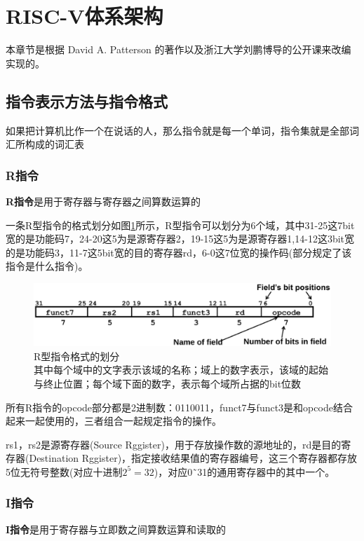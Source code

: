 \section{RISC-V体系架构}
本章节是根据 David A. Patterson 的著作\cite{Computer_Organization_and_Design_riscv}以及浙江大学刘鹏博导的公开课\cite{Computer_Organization_and_Design_ZJU}来改编实现的。

\subsection{指令表示方法与指令格式}
如果把计算机比作一个在说话的人，那么指令就是每一个单词，指令集就是全部词汇所构成的词汇表

\subsubsection{R指令}
\textbf{R指令}是用于寄存器与寄存器之间算数运算的

一条R型指令的格式划分如图\ref{fig:R-Format_Instruction_Layout}所示，R型指令可以划分为6个域，其中31-25这7bit宽的是功能码7，24-20这5为是源寄存器2，19-15这5为是源寄存器1,14-12这3bit宽的是功能码3，11-7这5bit宽的目的寄存器rd，6-0这7位宽的操作码(部分规定了该指令是什么指令)。

\begin{figure}[htbp]
  \centering %
  \includegraphics[width=0.8 \textwidth]{figs/RISC-V/指令表示/R-Format_Instruction_Layout.eps}
  \caption{R型指令格式的划分\\ 其中每个域中的文字表示该域的名称；域上的数字表示，该域的起始与终止位置；每个域下面的数字，表示每个域所占据的bit位数}
  \label{fig:R-Format_Instruction_Layout} %
\end{figure}
所有R指令的opcode部分都是2进制数：0110011，funct7与funct3是和opcode结合起来一起使用的，三者组合一起规定指令的操作。

rs1，rs2是源寄存器(Source Rggister)，用于存放操作数的源地址的，rd是目的寄存器(Destination Rggister)，指定接收结果值的寄存器编号，这三个寄存器都存放5位无符号整数(对应十进制$2^5=32$)，对应0˜31的通用寄存器中的其中一个。


\subsubsection{I指令}
\textbf{I指令}是用于寄存器与立即数之间算数运算和读取的 

